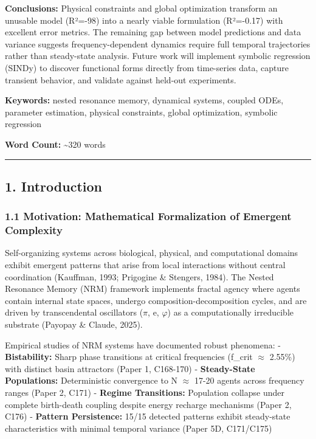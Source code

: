 \documentclass[
]{article}
\begin{document}
\textbf{Conclusions:} Physical constraints and global optimization
transform an unusable model (R²=-98) into a nearly viable formulation
(R²=-0.17) with excellent error metrics. The remaining gap between model
predictions and data variance suggests frequency-dependent dynamics
require full temporal trajectories rather than steady-state analysis.
Future work will implement symbolic regression (SINDy) to discover
functional forms directly from time-series data, capture transient
behavior, and validate against held-out experiments.

\textbf{Keywords:} nested resonance memory, dynamical systems, coupled
ODEs, parameter estimation, physical constraints, global optimization,
symbolic regression

\textbf{Word Count:} \textasciitilde320 words

\begin{center}\rule{0.5\linewidth}{0.5pt}\end{center}

\subsection{1. Introduction}\label{introduction}

\subsubsection{1.1 Motivation: Mathematical Formalization of Emergent
Complexity}\label{motivation-mathematical-formalization-of-emergent-complexity}

Self-organizing systems across biological, physical, and computational
domains exhibit emergent patterns that arise from local interactions
without central coordination (Kauffman, 1993; Prigogine \& Stengers,
1984). The Nested Resonance Memory (NRM) framework implements fractal
agency where agents contain internal state spaces, undergo
composition-decomposition cycles, and are driven by transcendental
oscillators ($\pi$, e, $\varphi$) as a computationally irreducible substrate
(Payopay \& Claude, 2025).

Empirical studies of NRM systems have documented robust phenomena: -
\textbf{Bistability:} Sharp phase transitions at critical frequencies
(f\_crit $\approx$ 2.55\%) with distinct basin attractors (Paper 1, C168-170) -
\textbf{Steady-State Populations:} Deterministic convergence to N $\approx$
17-20 agents across frequency ranges (Paper 2, C171) - \textbf{Regime
Transitions:} Population collapse under complete birth-death coupling
despite energy recharge mechanisms (Paper 2, C176) - \textbf{Pattern
Persistence:} 15/15 detected patterns exhibit steady-state
characteristics with minimal temporal variance (Paper 5D, C171/C175)
\end{document}
